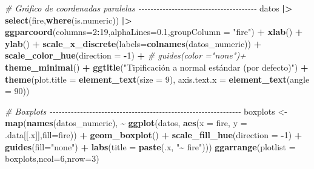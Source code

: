 \documentclass[12pt,a4paper,]{book}
\newenvironment{Shaded}{\begin{snugshade}}{\end{snugshade}}
\newcommand{\AttributeTok}[1]{\textcolor[rgb]{0.13,0.29,0.53}{#1}}
\newcommand{\CommentTok}[1]{\textcolor[rgb]{0.56,0.35,0.01}{\textit{#1}}}
\newcommand{\DecValTok}[1]{\textcolor[rgb]{0.00,0.00,0.81}{#1}}
\newcommand{\FloatTok}[1]{\textcolor[rgb]{0.00,0.00,0.81}{#1}}
\newcommand{\FunctionTok}[1]{\textcolor[rgb]{0.13,0.29,0.53}{\textbf{#1}}}
\newcommand{\NormalTok}[1]{#1}
\newcommand{\OtherTok}[1]{\textcolor[rgb]{0.56,0.35,0.01}{#1}}
\newcommand{\SpecialCharTok}[1]{\textcolor[rgb]{0.81,0.36,0.00}{\textbf{#1}}}
\newcommand{\StringTok}[1]{\textcolor[rgb]{0.31,0.60,0.02}{#1}}
\numberwithin{dummy}{section}
\theoremstyle{ocrenumbox}
\theoremstyle{blacknumex}
\theoremstyle{blacknumbox}
\theoremstyle{ocrenum}
\theoremstyle{ocrenum}
\begin{document}
\begin{Shaded}
\begin{Highlighting}[]
\CommentTok{\# Gráfico de coordenadas paralelas {-}{-}{-}{-}{-}{-}{-}{-}{-}{-}{-}{-}{-}{-}{-}{-}{-}{-}{-}{-}{-}{-}{-}{-}{-}{-}{-}{-}{-}{-}{-}{-}{-}{-}{-}{-}{-}{-}{-}}
\NormalTok{datos }\SpecialCharTok{|\textgreater{}} 
  \FunctionTok{select}\NormalTok{(fire,}\FunctionTok{where}\NormalTok{(is.numeric)) }\SpecialCharTok{|\textgreater{}} 
  \FunctionTok{ggparcoord}\NormalTok{(}\AttributeTok{columns=}\DecValTok{2}\SpecialCharTok{:}\DecValTok{19}\NormalTok{,}\AttributeTok{alphaLines=}\FloatTok{0.1}\NormalTok{,}\AttributeTok{groupColumn =} \StringTok{"fire"}\NormalTok{) }\SpecialCharTok{+}
  \FunctionTok{xlab}\NormalTok{(}\StringTok{\textquotesingle{}\textquotesingle{}}\NormalTok{) }\SpecialCharTok{+} 
  \FunctionTok{ylab}\NormalTok{(}\StringTok{\textquotesingle{}\textquotesingle{}}\NormalTok{) }\SpecialCharTok{+} 
  \FunctionTok{scale\_x\_discrete}\NormalTok{(}\AttributeTok{labels=}\FunctionTok{colnames}\NormalTok{(datos\_numeric)) }\SpecialCharTok{+}
  \FunctionTok{scale\_color\_hue}\NormalTok{(}\AttributeTok{direction =} \SpecialCharTok{{-}}\DecValTok{1}\NormalTok{) }\SpecialCharTok{+}
  \CommentTok{\# guides(color ="none")+}
  \FunctionTok{theme\_minimal}\NormalTok{() }\SpecialCharTok{+} 
  \FunctionTok{ggtitle}\NormalTok{(}\StringTok{"Tipificación a normal estándar (por defecto)"}\NormalTok{) }\SpecialCharTok{+}
  \FunctionTok{theme}\NormalTok{(}\AttributeTok{plot.title =} \FunctionTok{element\_text}\NormalTok{(}\AttributeTok{size =} \DecValTok{9}\NormalTok{),}
        \AttributeTok{axis.text.x =} \FunctionTok{element\_text}\NormalTok{(}\AttributeTok{angle =} \DecValTok{90}\NormalTok{))}

\CommentTok{\# Boxplots {-}{-}{-}{-}{-}{-}{-}{-}{-}{-}{-}{-}{-}{-}{-}{-}{-}{-}{-}{-}{-}{-}{-}{-}{-}{-}{-}{-}{-}{-}{-}{-}{-}{-}{-}{-}{-}{-}{-}{-}{-}{-}{-}{-}{-}{-}{-}{-}{-}{-}{-}{-}{-}{-}{-}{-}{-}{-}{-}{-}{-}{-}{-}}
\NormalTok{boxplots }\OtherTok{\textless{}{-}} \FunctionTok{map}\NormalTok{(}\FunctionTok{names}\NormalTok{(datos\_numeric), }\SpecialCharTok{\textasciitilde{}} \FunctionTok{ggplot}\NormalTok{(datos, }\FunctionTok{aes}\NormalTok{(}\AttributeTok{x =}\NormalTok{ fire, }\AttributeTok{y =}\NormalTok{ .data[[.x]],}\AttributeTok{fill=}\NormalTok{fire)) }\SpecialCharTok{+}
                  \FunctionTok{geom\_boxplot}\NormalTok{() }\SpecialCharTok{+}
                  \FunctionTok{scale\_fill\_hue}\NormalTok{(}\AttributeTok{direction =} \SpecialCharTok{{-}}\DecValTok{1}\NormalTok{) }\SpecialCharTok{+}
                  \FunctionTok{guides}\NormalTok{(}\AttributeTok{fill=}\StringTok{"none"}\NormalTok{) }\SpecialCharTok{+}
                  \FunctionTok{labs}\NormalTok{(}\AttributeTok{title =} \FunctionTok{paste}\NormalTok{(.x, }\StringTok{"\textasciitilde{} fire"}\NormalTok{)))}
\FunctionTok{ggarrange}\NormalTok{(}\AttributeTok{plotlist =}\NormalTok{ boxplots,}\AttributeTok{ncol=}\DecValTok{6}\NormalTok{,}\AttributeTok{nrow=}\DecValTok{3}\NormalTok{)}


\end{Highlighting}
\end{Shaded}
\end{document}
